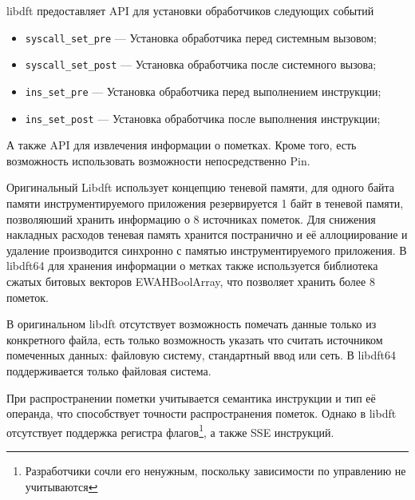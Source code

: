 
libdft предоставляет API для установки обработчиков следующих событий
\begin{itemize}
    \item \texttt{syscall\_set\_pre} --- Установка обработчика перед системным вызовом;
    \item \texttt{syscall\_set\_post} --- Установка обработчика после системного вызова;
    \item \texttt{ins\_set\_pre} --- Установка обработчика перед выполнением инструкции;
    \item \texttt{ins\_set\_post} --- Установка обработчика после выполнения инструкции;
\end{itemize}
А также API для извлечения информации о пометках. Кроме того, есть возможность использовать возможности непосредственно Pin.

Оригинальный Libdft использует концепцию теневой памяти, для одного байта памяти инструментируемого приложения резервируется 1 байт в теневой памяти, позволяюший хранить информацию о 8 источниках пометок. Для снижения накладных расходов теневая память хранится постранично и её аллоциирование и удаление производится синхронно с памятью инструментируемого приложения.
В libdft64 для хранения информации о метках также используется библиотека сжатых битовых векторов EWAHBoolArray, что позволяет хранить более 8 пометок.

В оригинальном libdft отсутствует возможность помечать данные только из конкретного файла, есть только возможность указать что считать источником помеченных данных: файловую систему, стандартный ввод или сеть.
В libdft64 поддерживается только файловая система.

При распространении пометки учитывается семантика инструкции и тип её операнда, что способствует точности распространения пометок. Однако в libdft отсутствует поддержка регистра флагов\footnote{Разработчики сочли его ненужным, поскольку зависимости по управлению не учитываются}, а также SSE инструкций.

